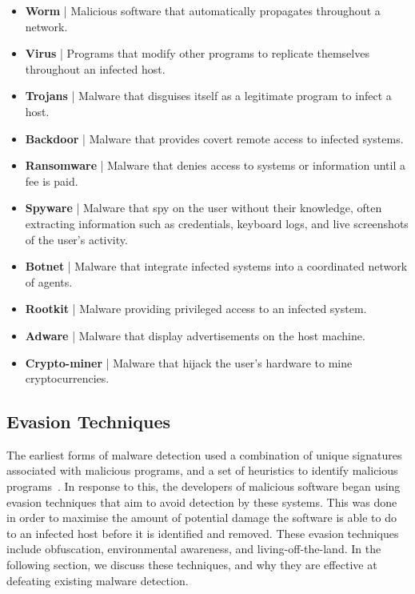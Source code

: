\documentclass{report}
\begin{document}
\begin{itemize}
    \item \textbf{Worm} | Malicious software that automatically propagates throughout a network. 
    \item \textbf{Virus} | Programs that modify other programs to replicate themselves throughout an infected host. 
    \item \textbf{Trojans} | Malware that disguises itself as a legitimate program to infect a host.
    \item \textbf{Backdoor} | Malware that provides covert remote access to infected systems. 
    \item \textbf{Ransomware} | Malware that denies access to systems or information until a fee is paid.
    \item \textbf{Spyware} | Malware that spy on the user without their knowledge, often extracting information such as credentials, keyboard logs, and live screenshots of the user's activity. 
    \item \textbf{Botnet} | Malware that integrate infected systems into a coordinated network of agents. 
    \item \textbf{Rootkit} | Malware providing privileged access to an infected system.
    \item \textbf{Adware} | Malware that display advertisements on the host machine.
    \item \textbf{Crypto-miner} | Malware that hijack the user's hardware to mine cryptocurrencies.
\end{itemize}

\subsection{Evasion Techniques}

The earliest forms of malware detection used a combination of unique signatures associated with malicious programs, and a set of heuristics to identify malicious programs~\citep{a.saeedSurveyMalwareMalware2013}. In response to this, the developers of malicious software began using evasion techniques that aim to avoid detection by these systems. This was done in order to maximise the amount of potential damage the software is able to do to an infected host before it is identified and removed. These evasion techniques include obfuscation, environmental awareness, and living-off-the-land. In the following section, we discuss these techniques, and why they are effective at defeating existing malware detection. 
\end{document}
